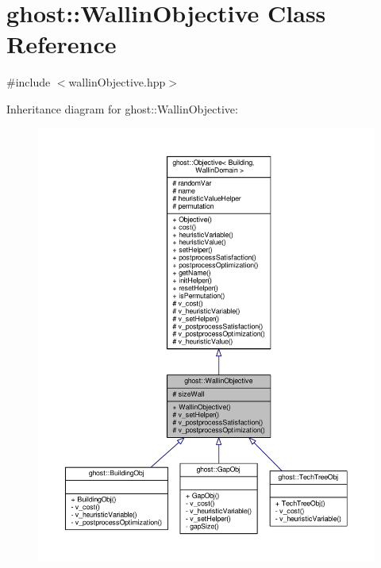 \hypertarget{classghost_1_1WallinObjective}{\section{ghost\-:\-:Wallin\-Objective Class Reference}
\label{classghost_1_1WallinObjective}
}


{\ttfamily \#include $<$wallin\-Objective.\-hpp$>$}



Inheritance diagram for ghost\-:\-:Wallin\-Objective\-:
\nopagebreak
\begin{figure}[H]
\begin{center}
\leavevmode
\includegraphics[width=350pt]{classghost_1_1WallinObjective__inherit__graph}
\end{center}
\end{figure}


